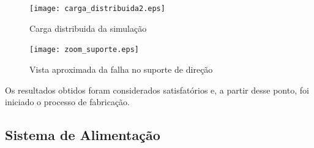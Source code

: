 \begin{figure}[!htbp]
	\centering
	\texttt{[image: carga\_distribuida2.eps]}
	\caption{Carga distribuida da simulação}
\end{figure}

\begin{figure}[!htbp]
	\centering
	\texttt{[image: zoom\_suporte.eps]}
	\caption{Vista aproximada da falha no suporte de direção}
\end{figure}

Os resultados obtidos foram considerados satisfatórios e, a partir desse ponto, foi iniciado o processo de fabricação.

  \subsection{Sistema de Alimentação}

